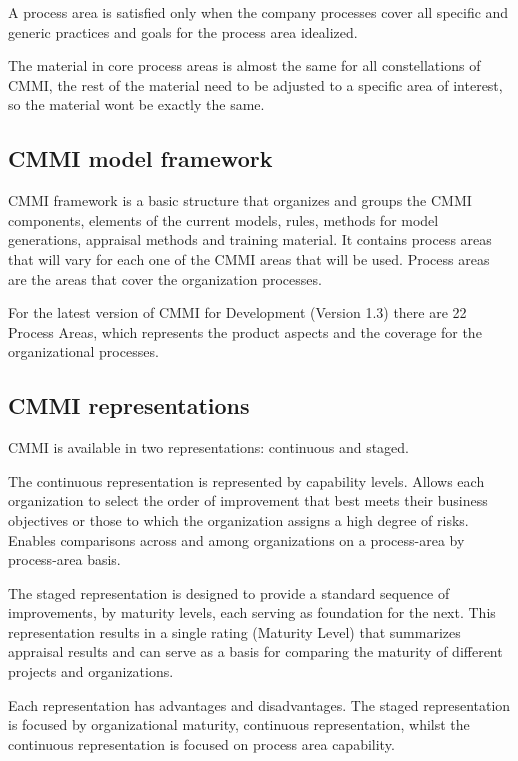 A process area is satisfied only when the company processes cover all specific and generic practices and goals for the process area idealized.

The material in core process areas is almost the same for all constellations of CMMI, the rest of the material need to be adjusted to a specific area of interest, so the material wont be exactly the same.



\subsection{CMMI model framework}
CMMI framework is a basic structure that organizes and groups the CMMI components, elements of the current models, rules, methods for model generations, appraisal methods and training material. It contains process areas that will vary for each one of the CMMI areas that will be used. Process areas are the areas that cover the organization processes.

For the latest version of CMMI for Development (Version 1.3) there are 22 Process Areas, which represents the product aspects and the coverage for the organizational processes.


\subsection{CMMI representations}

CMMI is available in two representations: continuous and staged.

The continuous representation is represented by capability levels. Allows each organization to select the order of improvement that best meets their business objectives or those to which the organization assigns a high degree of risks. Enables comparisons across and among organizations on a process-area by process-area basis.


The staged representation is designed to provide a standard sequence of improvements, by maturity levels, each serving as foundation for the next. This representation results in a single rating (Maturity Level) that summarizes appraisal results and can serve as a basis for comparing the maturity of different projects and organizations.

Each representation has advantages and disadvantages. The staged representation is focused by organizational maturity, continuous representation, whilst the continuous representation is focused on process area capability.

